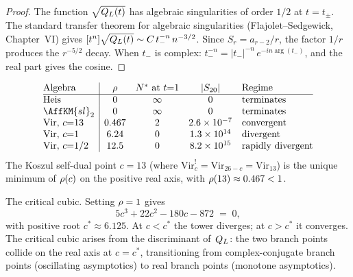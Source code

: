 \begin{proof}
The function $\sqrt{Q_L(t)}$ has algebraic
singularities of order $1/2$ at $t = t_\pm$. The standard
transfer theorem for algebraic singularities
(Flajolet--Sedgewick, Chapter~VI) gives
$[t^n] \sqrt{Q_L(t)} \sim C\, t_-^{-n}\, n^{-3/2}$.
Since $S_r = a_{r-2}/r$, the factor $1/r$ produces the
$r^{-5/2}$ decay. When $t_-$ is complex:
$t_-^{-n} = |t_-|^{-n}\, e^{-in\arg(t_-)}$, and the real
part gives the cosine.
\end{proof}

\begin{example}
\label{ex:comp-shadow-growth-classification}
\[
\begin{array}{@{}l|cccl@{}}
 \text{Algebra} & \ShadowGrowth & N^* \text{ at } t{=}1
 & |S_{20}| & \text{Regime} \\
\hline
 \text{Heis} & 0 & \infty & 0 & \text{terminates} \\
 \AffKM{sl}_2 & 0 & \infty & 0 & \text{terminates} \\
 \text{Vir},\, c{=}13 & 0.467 & 2 & 2.6 \times 10^{-7}
 & \text{convergent} \\
 \text{Vir},\, c{=}1 & 6.24 & 0 & 1.3 \times 10^{14}
 & \text{divergent} \\
 \text{Vir},\, c{=}1/2 & 12.5 & 0 & 8.2 \times 10^{15}
 & \text{rapidly divergent}
\end{array}
\]
The Koszul self-dual point $c = 13$ (where
$\mathrm{Vir}_c^! = \mathrm{Vir}_{26-c} = \mathrm{Vir}_{13}$)
is the unique minimum of $\rho(c)$ on the positive
real axis, with $\rho(13) \approx 0.467 < 1$.
\end{example}

The critical cubic. Setting $\rho = 1$ gives
\begin{equation}\label{eq:comp-critical-cubic}
 5c^3 + 22c^2 - 180c - 872 \;=\; 0,
\end{equation}
with positive root $c^* \approx 6.125$. At $c < c^*$ the
tower diverges; at $c > c^*$ it converges. The critical cubic
arises from the discriminant of~$Q_L$: the two branch
points collide on the real axis at $c = c^*$, transitioning
from complex-conjugate branch points (oscillating asymptotics)
to real branch points (monotone asymptotics).

